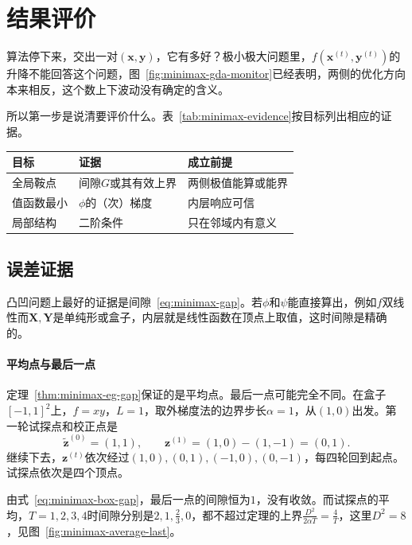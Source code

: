\section{结果评价}
\label{sec:minimax-evaluation}

算法停下来，交出一对$(\bm{x},\bm{y})$，它有多好？极小极大问题里，$f(\bm{x}^{(t)},\bm{y}^{(t)})$的升降不能回答这个问题，图~\ref{fig:minimax-gda-monitor}已经表明，两侧的优化方向本来相反，这个数上下波动没有确定的含义。

所以第一步是说清要评价什么。表~\ref{tab:minimax-evidence}按目标列出相应的证据。

\begin{BookInlineTable}
 \centering
 \begin{tabular}{@{}lll@{}}
  \toprule
  目标 & 证据 & 成立前提\\
  \midrule
  全局鞍点 & 间隙$G$或其有效上界 & 两侧极值能算或能界\\
  值函数最小 & $\phi$的（次）梯度 & 内层响应可信\\
  局部结构 & 二阶条件 & 只在邻域内有意义\\
  \bottomrule
 \end{tabular}
 \caption{评价目标与相应的证据。}
 \label{tab:minimax-evidence}
\end{BookInlineTable}

\subsection{误差证据}
\label{sec:minimax-error-evidence}

凸凹问题上最好的证据是间隙~\eqref{eq:minimax-gap}。若$\phi$和$\psi$能直接算出，例如$f$双线性而$\bm{X},\bm{Y}$是单纯形或盒子，内层就是线性函数在顶点上取值，这时间隙是精确的。

\paragraph{平均点与最后一点}
定理~\ref{thm:minimax-eg-gap}保证的是平均点。最后一点可能完全不同。在盒子$[-1,1]^2$上，$f=xy$，$L=1$，取外梯度法的边界步长$\alpha=1$，从$(1,0)$出发。第一轮试探点和校正点是
\[
 \tilde{\bm{z}}^{(0)}=(1,1),\qquad\bm{z}^{(1)}=(1,0)-(1,-1)=(0,1).
\]
继续下去，$\bm{z}^{(t)}$依次经过$(1,0),(0,1),(-1,0),(0,-1)$，每四轮回到起点。试探点依次是四个顶点。

由式~\eqref{eq:minimax-box-gap}，最后一点的间隙恒为$1$，没有收敛。而试探点的平均，$T=1,2,3,4$时间隙分别是$2,1,\frac23,0$，都不超过定理的上界$\frac{D^2}{2\alpha T}=\frac4T$，这里$D^2=8$，见图~\ref{fig:minimax-average-last}。


